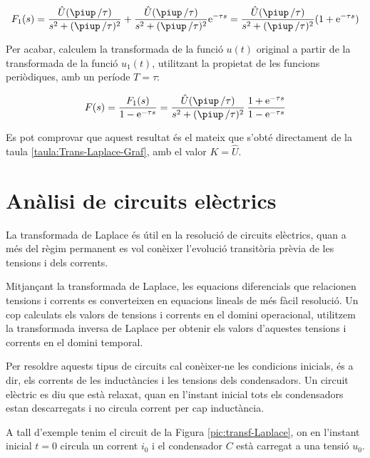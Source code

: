 \begin{exemple}
    \[
        F_1(s) = \frac{\hat{U} (\piup\,/\tau)}{s^2 + (\piup\,/\tau)^2} +
        \frac{\hat{U} (\piup\,/\tau)}{s^2 + (\piup\,/\tau)^2} \eu^{-\tau s} =
        \frac{\hat{U} (\piup\,/\tau)}{s^2 + (\piup\,/\tau)^2} (1+\eu^{-\tau s})
    \]

    Per acabar, calculem la transformada de la funció $u(t)$ original a
    partir de la transformada de la funció $u_1(t)$, utilitzant la
    propietat de les funcions periòdiques, amb un període $T=\tau$:

    \[
        F(s) = \frac{F_1(s)}{1-\eu^{-\tau s}} =
        \frac{\hat{U} (\piup\,/\tau) }{s^2 + (\piup\,/\tau)^2}\,\frac{1+\eu^{-\tau s}}{1-\eu^{-\tau
        s}}
    \]

    Es pot comprovar que aquest resultat és el mateix que s'obté directament de la taula \vref{taula:Trans-Laplace-Graf}, amb el valor $K=\hat{U}$.
\end{exemple}

\section{Anàlisi de circuits elèctrics}

La transformada de Laplace és útil en la resolució de circuits
elèctrics, quan a més del règim permanent es vol conèixer
l'evolució transitòria prèvia de les tensions i dels corrents.

Mitjançant la transformada de Laplace, les equacions diferencials
que relacionen tensions i corrents es converteixen en equacions
lineals de més fàcil resolució. Un cop calculats els valors de
tensions i corrents en el domini operacional, utilitzem la
transformada inversa de Laplace per obtenir els valors d'aquestes
tensions i corrents en el domini temporal.

Per  resoldre aquests tipus de circuits cal conèixer-ne les
condicions inicials, és a dir, els corrents de les inductàncies i
les tensions dels condensadors. Un circuit elèctric es diu que està
relaxat, quan en l'instant inicial tots els condensadors estan
descarregats i no circula corrent per cap inductància.

A tall d'exemple tenim el circuit de la Figura
\vref{pic:transf-Laplace}, on en l'instant inicial $t=0$ circula un
corrent $i_0$ i el condensador $C$ està carregat a una tensió $u_0$.

\begin{center}
    
    \label{pic:transf-Laplace}
\end{center}

